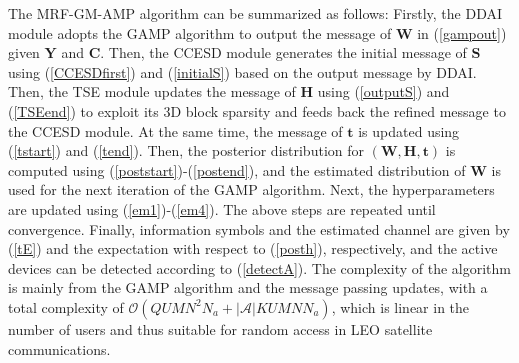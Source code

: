 \documentclass[conference]{IEEEtran}
\begin{document}
	
	The MRF-GM-AMP algorithm can be summarized as follows: Firstly, the DDAI module adopts the GAMP algorithm to output the message of $\mathbf W$ in (\ref{gampout}) given $\mathbf Y$ and $\mathbf C$. Then, the CCESD module generates the initial message of $\mathbf S$ using (\ref{CCESDfirst}) and (\ref{initialS}) based on the output message by DDAI. Then, the TSE module updates the message of $\mathbf H$ using (\ref{outputS}) and (\ref{TSEend}) to exploit its 3D block sparsity and feeds back the refined message to the CCESD module. At the same time, the message of $\mathbf t$ is updated using (\ref{tstart}) and (\ref{tend}). Then, the posterior distribution for $(\mathbf W, \mathbf H, \mathbf t)$ is computed using (\ref{poststart})-(\ref{postend}), and the estimated distribution of $\mathbf W$ is used for the next iteration of the GAMP algorithm. Next, the hyperparameters are updated using (\ref{em1})-(\ref{em4}). The above steps are repeated until convergence. Finally, information symbols and the estimated channel are given by (\ref{tE}) and the expectation with respect to (\ref{posth}), respectively, and the active devices can be detected according to (\ref{detectA}). The complexity of the algorithm is mainly from the GAMP algorithm and the message passing updates, with a total complexity of $\mathcal{O}(QUMN^2N_a + |\mathcal A|KUMNN_a)$, which is linear in the number of users and thus suitable for random access in LEO satellite communications.
\end{document}
